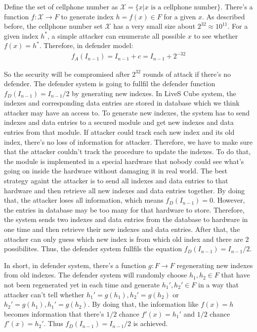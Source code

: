 \documentclass[10pt,a4paper]{article}
\begin{document}
		Define the set of cellphone number as $\mathcal X = \{x | \text{$x$ is a cellphone number}\}$.
		There's a function $f: \mathcal X \rightarrow F$ to generate index $h = f(x) \in F$ for
		a given $x$. As described before, the cellphone number set $\mathcal X$ has a very small
		size about $2^{32} \approx 10^{11}$. For a given index $h^*$, a simple attacker
		can enumerate all possible $x$ to see whether $f(x) = h^*$. Therefore, in defender
		model:
		\begin{align*}
			f_A(I_{n-1}) = I_{n-1}+c = I_{n-1}+2^{-32}
		\end{align*}
		
		So the security will be compromised after $2^{32}$ rounds of attack if there's
		no defender. The defender system is going to fullfil the defender
		function $f_D(I_{n-1}) = I_{n-1}/2$ by generating new indexes.
		In LiveS Cube system, the indexes and corresponding data entries are stored
		in database which we think attacker may have an access to. To generate
		new indexes, the system has to send indexes and data entries to a 
		secured module
		and get new indexes and data entries from that module. If attacker
		could track each new index and its old index, there's no loss of information 
		for attacker. Therefore, we have to make sure that the attacker couldn't track
		the procedure to update the indexes.
		To do that, the module is implemented in a special hardware that nobody
		could see what's going on inside the hardware without damaging it in real world.
		The best strategy againt the attacker 
		is to send all indexes and data entries to that hardware and then
		retrieve all new indexes and data entries together. By doing that, the attacker
		loses all information, which means $f_D(I_{n-1}) = 0$. However, the entries
		in database may be too many for that hardware to store. Therefore, the system
		sends two indexes and data entries from the database to hardware in one time and
		then retrieve their new indexes and data entries. After that, the attacker can
		only guess which new index is from which old index and there are $2$ possibilites.
		Thus, the defender system fullfils the equation $f_D(I_{n-1}) = I_{n-1}/2$.
		
		In short, in defender system,
		there's a function $g: F \rightarrow F$ regenerating 
		new indexes from old indexes. The defender system
		will randomly choose $h_1, h_2 \in F$ that have
		not been regenerated yet in each time and generate
		$h_1', h_2' \in F$ in a way that attacker can't tell whether
		$h_1' = g(h_1), h_2' = g(h_2)$ or $h_2' = g(h_1), h_1' = g(h_2)$.
		By doing that, the information like $f(x) = h$ becomes
		information that there's $1/2$ chance $f'(x) = h_1'$ and $1/2$ chance $f'(x) = h_2'$.
		Thus $f_D(I_{n-1}) = I_{n-1}/2$ is achieved.
		
\end{document}
